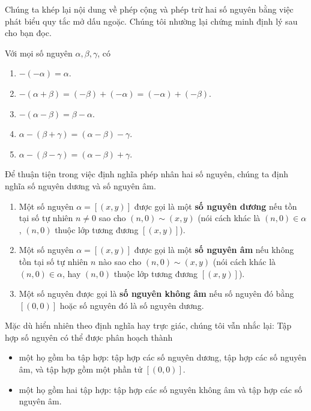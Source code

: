 Chúng ta khép lại nội dung về phép cộng và phép trừ hai số nguyên bằng việc phát biểu quy tắc mở dấu ngoặc. Chúng tôi nhường lại chứng minh định lý sau cho bạn đọc.

\begin{theorem}
	Với mọi số nguyên $\alpha, \beta, \gamma$, có
	\begin{enumerate}[label={(\roman*)}]
		\item $-(-\alpha) = \alpha$.
		\item $-(\alpha + \beta) = (-\beta) + (-\alpha) = (-\alpha) + (-\beta)$.
		\item $-(\alpha - \beta) = \beta - \alpha$.
		\item $\alpha - (\beta + \gamma) = (\alpha - \beta) - \gamma$.
		\item $\alpha - (\beta - \gamma) = (\alpha - \beta) + \gamma$.
	\end{enumerate}
\end{theorem}

Để thuận tiện trong việc định nghĩa phép nhân hai số nguyên, chúng ta định nghĩa số nguyên dương và số nguyên âm.
\begin{definition}
	\begin{enumerate}[label={(\roman*)}]
		\item Một số nguyên $\alpha = [(x, y)]$ được gọi là một \textbf{số nguyên dương} nếu tồn tại số tự nhiên $n\ne 0$ sao cho $(n, 0)\sim (x, y)$ (nói cách khác là $(n, 0)\in \alpha$, $(n, 0)$ thuộc lớp tương đương $[(x, y)]$).
		\item Một số nguyên $\alpha = [(x, y)]$ được gọi là một \textbf{số nguyên âm} nếu không tồn tại số tự nhiên $n$ nào sao cho $(n, 0)\sim (x, y)$ (nói cách khác là $(n, 0)\in \alpha$, hay $(n, 0)$ thuộc lớp tương đương $[(x, y)]$).
		\item Một số nguyên được gọi là \textbf{số nguyên không âm} nếu số nguyên đó bằng $[(0, 0)]$ hoặc số nguyên đó là số nguyên dương.
	\end{enumerate}
\end{definition}

Mặc dù hiển nhiên theo định nghĩa hay trực giác, chúng tôi vẫn nhắc lại: Tập hợp số nguyên có thể được phân hoạch thành
\begin{itemize}
	\item một họ gồm ba tập hợp: tập hợp các số nguyên dương, tập hợp các số nguyên âm, và tập hợp gồm một phần tử $[(0,0)]$.
	\item một họ gồm hai tập hợp: tập hợp các số nguyên không âm và tập hợp các số nguyên âm.
\end{itemize}

